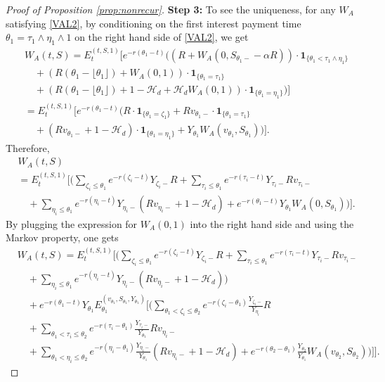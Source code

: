 \documentclass[draft, noinfoline]{ectaart}
\numberwithin{equation}{section}
\theoremstyle{plain}
\begin{document}
\begin{appendices}
\begin{proof}[Proof of Proposition \ref{prop:nonrecur}]
	{\flushleft\bf Step 3:} To see the uniqueness, for any $W_A$ satisfying \eqref{VAL2}, by conditioning on the first interest payment time $\theta_1=\tau_1\land\eta_1\land1$ on the right hand side of \eqref{VAL2}, we get
	\begin{align*}
	&W_A(t,S)=E_t^{(t,S,1)}\Bigg[e^{-r(\theta_1-t)}\Bigg((R+W_A(0,S_{\theta_1-}-\alpha R))\cdot\mathbf{1}_{\{\theta_1<\tau_1\land\eta_1\}}\\
	&\quad+(R(\theta_1-\lfloor\theta_1\rfloor)+W_A(0,1))\cdot\mathbf{1}_{\{\theta_1=\tau_1\}}\\
	&\quad+(R(\theta_1-\lfloor\theta_1\rfloor)+1-\mathcal{H}_d+\mathcal{H}_d W_A(0,1))\cdot \mathbf{1}_{\{\theta_1=\eta_1\}}\Bigg)\Bigg]\\
	&=E_t^{(t,S,1)}\Bigg[e^{-r(\theta_1-t)}\Bigg(R\cdot\mathbf{1}_{\{\theta_1=\zeta_1\}}+Rv_{\theta_1-}\cdot\mathbf{1}_{\{\theta_1=\tau_1\}}\\
	&\quad+(Rv_{\theta_1-}+1-\mathcal{H}_d)\cdot \mathbf{1}_{\{\theta_1=\eta_1\}}+Y_{\theta_1} W_A(v_{\theta_1},S_{\theta_1})\Bigg)\Bigg].
	\end{align*}
	Therefore,
	\begin{align*}
	&W_A(t,S) \\
	&=E_t^{(t,S,1)}\Bigg[\Bigg(\sum_{\zeta_i\le\theta_1}e^{-r(\zeta_i-t)}Y_{\zeta_i-}R+\sum_{\tau_i\le\theta_1}e^{-r(\tau_i-t)}Y_{\tau_i-}Rv_{\tau_i-}\\
	&\quad+\sum_{\eta_i\le\theta_1}e^{-r(\eta_i-t)}Y_{\eta_i-}(Rv_{\eta_i-}+1-\mathcal{H}_d)+e^{-r(\theta_1-t)}Y_{\theta_1} W_A(0,S_{\theta_1})\Bigg)\Bigg].
	\end{align*}
	By plugging the expression for $W_A(0,1)$ into the right hand side and using the Markov property, one gets
	\begin{align*}
	&W_A(t,S)=E_t^{(t,S,1)}\Bigg[\Bigg(\sum_{\zeta_i\le\theta_1}e^{-r(\zeta_i-t)}Y_{\zeta_i-}R+\sum_{\tau_i\le\theta_1}e^{-r(\tau_i-t)}Y_{\tau_i-}Rv_{\tau_i-}\\
	&\quad+\sum_{\eta_i\le\theta_1}e^{-r(\eta_i-t)}Y_{\eta_i-}(Rv_{\eta_i-}+1-\mathcal{H}_d)\Bigg)\\
	&\quad+e^{-r(\theta_1-t)}Y_{\theta_1} E_{\theta_1}^{(v_{\theta_1},S_{\theta_1},Y_{\theta_1})}\Bigg[\Bigg(\sum_{\theta_1<\zeta_i\le\theta_2}e^{-r(\zeta_i-\theta_1)}\frac{Y_{\zeta_i-}}{Y_{\eta_i}}R   \\
	&\quad+\sum_{\theta_1<\tau_i\le\theta_2}e^{-r(\tau_i-\theta_1)}\frac{Y_{\tau_i-}}{Y_{\theta_1}}Rv_{\eta_i-}\\
	&\quad+\sum_{\theta_1<\eta_i\le\theta_2}e^{-r(\eta_i-\theta_1)}\frac{Y_{\eta_i-}}{Y_{\theta_1}}(Rv_{\eta_i-}+1-\mathcal{H}_d)+e^{-r(\theta_2-\theta_1)}\frac{Y_{\theta_2}}{Y_{\theta_1}} W_A(v_{\theta_2},S_{\theta_2})\Bigg)\Bigg]\Bigg].

\end{align*}
\end{proof}
\end{appendices}
\end{document}
